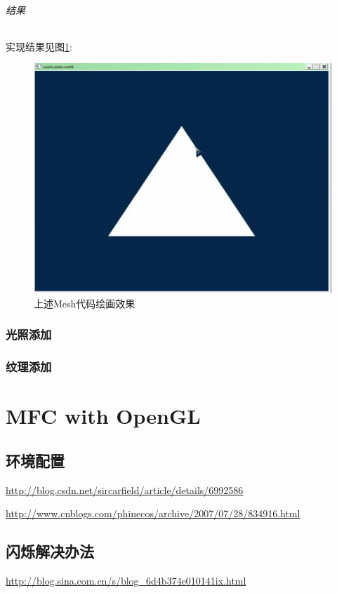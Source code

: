 \documentclass[UTF8,a4paper,8pt]{ctexbook}
\begin{document}
		\subparagraph{结果}
			实现结果见图\ref{VAOResult}:
			\begin{figure}[h]
				\centering
				\includegraphics[scale = 0.5]{VBOMeshResult.png}
				\caption{上述Mesh代码绘画效果}
				\label{VAOResult}
			\end{figure}
	
	\subsection{光照添加}
	
	\subsection{纹理添加}
		

\chapter{MFC with OpenGL}
	\section{环境配置}
		\url{http://blog.csdn.net/sircarfield/article/details/6992586}
		
		\url{http://www.cnblogs.com/phinecos/archive/2007/07/28/834916.html}
		
	\section{闪烁解决办法}
		\url{http://blog.sina.com.cn/s/blog_6d4b374e010141ix.html}
		    
\end{document}
